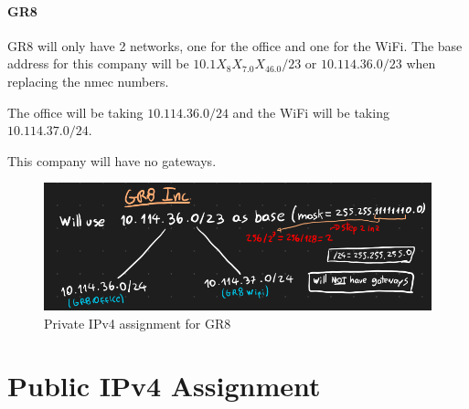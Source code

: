 \documentclass{report}
\begin{document}
\subsubsection*{GR8}
GR8 will only have 2 networks, one for the office and one for the WiFi. The base address for this company will be $10.1X_8X_7.0X_46.0/23$ or $10.114.36.0/23$ when replacing the nmec numbers.

The office will be taking $10.114.36.0/24$ and the WiFi will be taking $10.114.37.0/24$.

This company will have no gateways.

\begin{figure}[H]
    \centering
    \includegraphics[width=\textwidth]{private-ipv4-gr8.png}
    \caption{Private IPv4 assignment for GR8}
    \label{fig:private-ipv4-gr8}
\end{figure}

\chapter*{Public IPv4 Assignment}
\end{document}
